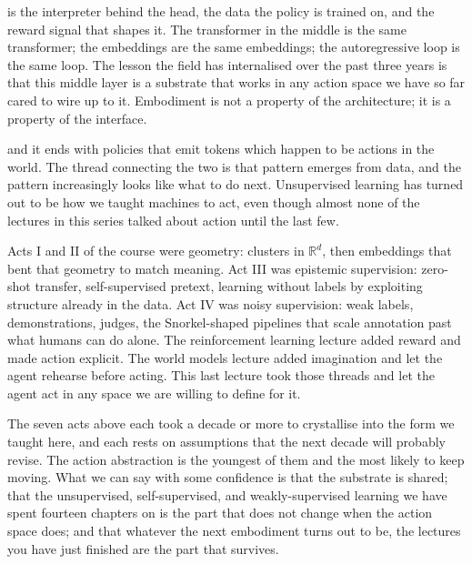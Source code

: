  is the interpreter behind the head, the data the policy is trained on, and the reward signal that shapes it. The transformer in the middle is the same transformer; the embeddings are the same embeddings; the autoregressive loop is the same loop. The lesson the field has internalised over the past three years is that this middle layer is a substrate that works in any action space we have so far cared to wire up to it. Embodiment is not a property of the architecture; it is a property of the interface.



 and it ends with policies that emit tokens which happen to be actions in the world. The thread connecting the two is that pattern emerges from data, and the pattern increasingly looks like what to do next. Unsupervised learning has turned out to be how we taught machines to act, even though almost none of the lectures in this series talked about action until the last few.

 Acts I and II of the course were geometry: clusters in $\mathbb{R}^d$, then embeddings that bent that geometry to match meaning. Act III was epistemic supervision: zero-shot transfer, self-supervised pretext, learning without labels by exploiting structure already in the data. Act IV was noisy supervision: weak labels, demonstrations, judges, the Snorkel-shaped pipelines that scale annotation past what humans can do alone. The reinforcement learning lecture added reward and made action explicit. The world models lecture added imagination and let the agent rehearse before acting. This last lecture took those threads and let the agent act in any space we are willing to define for it.

 The seven acts above each took a decade or more to crystallise into the form we taught here, and each rests on assumptions that the next decade will probably revise. The action abstraction is the youngest of them and the most likely to keep moving. What we can say with some confidence is that the substrate is shared; that the unsupervised, self-supervised, and weakly-supervised learning we have spent fourteen chapters on is the part that does not change when the action space does; and that whatever the next embodiment turns out to be, the lectures you have just finished are the part that survives.

\fi
